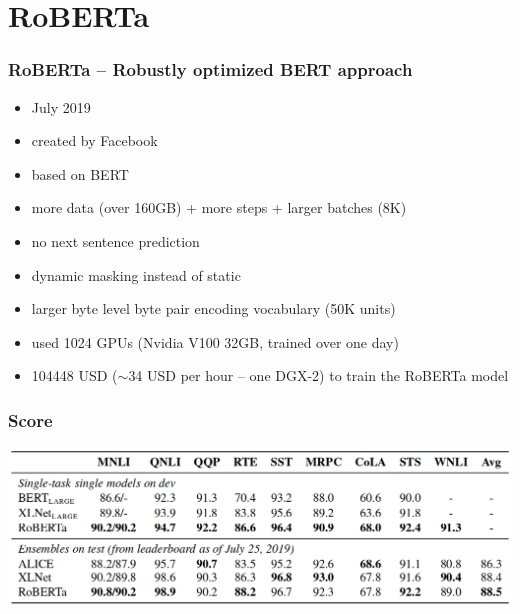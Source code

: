\documentclass{beamer}
\begin{document}
\section{RoBERTa}
\begin{frame}
    \frametitle{RoBERTa -- \textbf{R}obustly \textbf{o}ptimized \textbf{BERT} \textbf{a}pproach \cite{roberta}}
    \begin{itemize}
        \item July 2019
        \item created by Facebook
        \item based on BERT
        \item more data (over 160GB) + more steps + larger batches (8K)
        \item no next sentence prediction
        \item dynamic masking instead of static
        \item larger byte level byte pair encoding vocabulary (50K units)
        \item used 1024 GPUs (Nvidia V100 32GB, trained over one day)
        \item 104448 USD ($\sim$34 USD per hour -- one DGX-2) to train the RoBERTa model
    \end{itemize}
\end{frame}

\begin{frame}
    \frametitle{Score}
    \begin{center}
        \includegraphics[scale=1.2]{img/RoBERTa-score.png}
    \end{center}
\end{frame}



\end{document}
